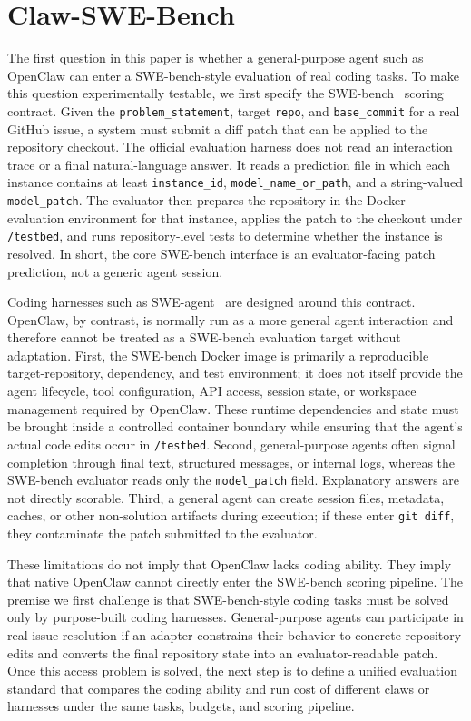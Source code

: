 \section{Claw-SWE-Bench}
\label{sec:claw_swe_bench}

The first question in this paper is whether a general-purpose agent such as OpenClaw can enter a SWE-bench-style evaluation of real coding tasks. To make this question experimentally testable, we first specify the SWE-bench~\cite{jimenez_swebench_2024} scoring contract. Given the \texttt{problem\_statement}, target \texttt{repo}, and \texttt{base\_commit} for a real GitHub issue, a system must submit a diff patch that can be applied to the repository checkout. The official evaluation harness does not read an interaction trace or a final natural-language answer. It reads a prediction file in which each instance contains at least \texttt{instance\_id}, \texttt{model\_name\_or\_path}, and a string-valued \texttt{model\_patch}. The evaluator then prepares the repository in the Docker evaluation environment for that instance, applies the patch to the checkout under \texttt{/testbed}, and runs repository-level tests to determine whether the instance is resolved. In short, the core SWE-bench interface is an evaluator-facing patch prediction, not a generic agent session.

Coding harnesses such as SWE-agent~\cite{swe_agent} are designed around this contract. OpenClaw, by contrast, is normally run as a more general agent interaction and therefore cannot be treated as a SWE-bench evaluation target without adaptation. First, the SWE-bench Docker image is primarily a reproducible target-repository, dependency, and test environment; it does not itself provide the agent lifecycle, tool configuration, API access, session state, or workspace management required by OpenClaw. These runtime dependencies and state must be brought inside a controlled container boundary while ensuring that the agent's actual code edits occur in \texttt{/testbed}. Second, general-purpose agents often signal completion through final text, structured messages, or internal logs, whereas the SWE-bench evaluator reads only the \texttt{model\_patch} field. Explanatory answers are not directly scorable. Third, a general agent can create session files, metadata, caches, or other non-solution artifacts during execution; if these enter \texttt{git diff}, they contaminate the patch submitted to the evaluator.

These limitations do not imply that OpenClaw lacks coding ability. They imply that native OpenClaw cannot directly enter the SWE-bench scoring pipeline. The premise we first challenge is that SWE-bench-style coding tasks must be solved only by purpose-built coding harnesses. General-purpose agents can participate in real issue resolution if an adapter constrains their behavior to concrete repository edits and converts the final repository state into an evaluator-readable patch. Once this access problem is solved, the next step is to define a unified evaluation standard that compares the coding ability and run cost of different claws or harnesses under the same tasks, budgets, and scoring pipeline.

